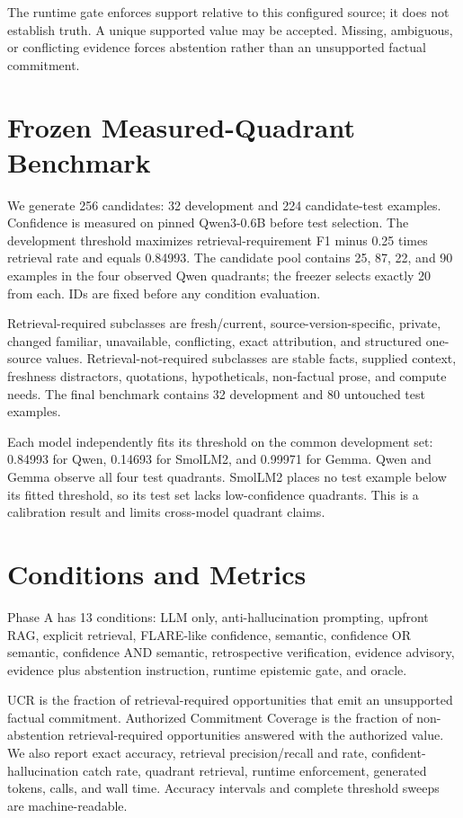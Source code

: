 \documentclass[11pt]{article}
\begin{document}
The runtime gate enforces support relative to this configured source; it does
not establish truth. A unique supported value may be accepted. Missing,
ambiguous, or conflicting evidence forces abstention rather than an unsupported
factual commitment.

\section{Frozen Measured-Quadrant Benchmark}
We generate 256 candidates: 32 development and 224 candidate-test examples.
Confidence is measured on pinned Qwen3-0.6B before test selection. The
development threshold maximizes retrieval-requirement F1 minus 0.25 times
retrieval rate and equals 0.84993. The candidate pool contains 25, 87, 22, and 90
examples in the four observed Qwen quadrants; the freezer selects exactly 20
from each. IDs are fixed before any condition evaluation.

Retrieval-required subclasses are fresh/current, source-version-specific,
private, changed familiar, unavailable, conflicting, exact attribution, and
structured one-source values. Retrieval-not-required subclasses are stable
facts, supplied context, freshness distractors, quotations, hypotheticals,
non-factual prose, and compute needs. The final benchmark contains 32 development
and 80 untouched test examples.

Each model independently fits its threshold on the common development set:
0.84993 for Qwen, 0.14693 for SmolLM2, and 0.99971 for Gemma. Qwen and Gemma
observe all four test quadrants. SmolLM2 places no test example below its fitted
threshold, so its test set lacks low-confidence quadrants. This is a calibration
result and limits cross-model quadrant claims.

\section{Conditions and Metrics}
Phase A has 13 conditions: LLM only, anti-hallucination prompting, upfront RAG,
explicit retrieval, FLARE-like confidence, semantic, confidence OR semantic,
confidence AND semantic, retrospective verification, evidence advisory,
evidence plus abstention instruction, runtime epistemic gate, and oracle.

UCR is the fraction of retrieval-required opportunities that emit an unsupported
factual commitment. Authorized Commitment Coverage is the fraction of
non-abstention retrieval-required opportunities answered with the authorized
value. We also report exact accuracy, retrieval precision/recall and rate,
confident-hallucination catch rate, quadrant retrieval, runtime enforcement,
generated tokens, calls, and wall time. Accuracy intervals and complete
threshold sweeps are machine-readable.
\end{document}
